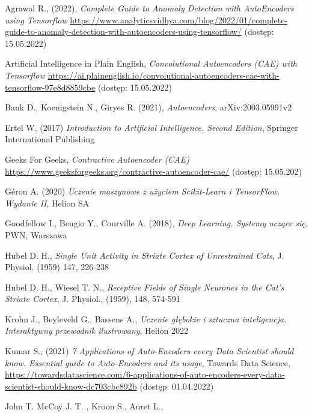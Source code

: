 \documentclass[12pt]{mwbk}
\theoremstyle{plain}
\theoremstyle{definition}
\theoremstyle{remark}
\begin{document}
\begin{thebibliography}{99}



 Agrawal R., (2022), \emph{Complete Guide to Anomaly Detection with AutoEncoders using Tensorflow} \url{https://www.analyticsvidhya.com/blog/2022/01/complete-guide-to-anomaly-detection-with-autoencoders-using-tensorflow/} (dostęp: 15.05.2022)

 Artificial Intelligence in Plain English, \emph{Convolutional Autoencoders (CAE) with Tensorflow} \url{https://ai.plainenglish.io/convolutional-autoencoders-cae-with-tensorflow-97e8d8859cbe} (dostęp: 15.05.2022)

 Bank D., Koenigstein N., Giryes R. (2021), \emph{Autoencoders}, arXiv:2003.05991v2




 Ertel W. (2017) \emph{Introduction to Artificial Intelligence. Second Edition}, Springer International Publishing

 Geeks For Geeks, \emph{Contractive Autoencoder (CAE)} \url{https://www.geeksforgeeks.org/contractive-autoencoder-cae/} (dostęp: 15.05.202)

 G\'eron A. (2020) \emph{Uczenie maszynowe z użyciem Scikit-Learn i TensorFlow. Wydanie II}, Helion SA

 Goodfellow I., Bengio Y., Courville A. (2018), \emph{Deep Learning. Systemy uczące się}, PWN, Warszawa 

 Hubel D. H., \emph{Single Unit Activity in  Striate Cortex of Unrestrained Cats}, J. Physiol. (1959) 147, 226-238

 Hubel D. H., Wiesel T. N., \emph{Receptive Fields of Single Neurones in the Cat's Striate Cortex}, J. Physiol., (1959), 148, 574-591

 Krohn J., Beyleveld G., Bassens A., \emph{Uczenie głębokie i sztuczna inteligencja. Interaktywny przewodnik ilustrowany}, Helion 2022

 Kumar S., (2021) \emph{7 Applications of Auto-Encoders every Data Scientist  should know. Essential guide to Auto-Encoders and its usage}, Towards Data Science, \url{https://towardsdatascience.com/6-applications-of-auto-encoders-every-data-scientist-should-know-dc703cbc892b} (dostęp: 01.04.2022)

 John T. McCoy J. T. , Kroon S.,  Auret L.,


\end{thebibliography}
\end{document}
